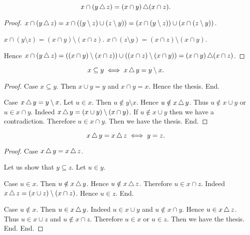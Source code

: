 \documentclass[../../set-theory.ftl.tex]{subfiles}
\begin{document}
\begin{forthel}
    \begin{proposition}\label{SetTheory_01_04_751668}
      \[ x \cap (y \mathop{\triangle} z) = (x \cap y) \mathop{\triangle} (x \cap z). \]
    \end{proposition}
    \begin{proof}
      $x \cap (y \mathop{\triangle} z) = x \cap ((y \setminus z) \cup (z \setminus y)) =
      (x \cap (y \setminus z)) \cup (x \cap (z \setminus y))$.

      $x \cap (y \setminus z) = (x \cap y) \setminus (x \cap z)$.
      $x \cap (z \setminus y) = (x \cap z) \setminus (x \cap y)$.

      Hence $x \cap (y \mathop{\triangle} z) = ((x \cap y) \setminus (x \cap z)) \cup
      ((x \cap z) \setminus (x \cap y)) = (x \cap y) \mathop{\triangle} (x \cap z)$.
    \end{proof}


    \begin{proposition}\label{SetTheory_01_04_420961}
      \[ x \subseteq y \iff x \mathop{\triangle} y = y \setminus x. \]
    \end{proposition}
    \begin{proof}
      Case $x \subseteq y$.
        Then $x \cup y = y$ and $x \cap y = x$.
        Hence the thesis.
      End.

      Case $x \mathop{\triangle} y = y \setminus x$.
        Let $u \in x$.
        Then $u \notin y \setminus x$.
        Hence $u \notin x \mathop{\triangle} y$.
        Thus $u \notin x \cup y$ or $u \in x \cap y$.
        Indeed $x \mathop{\triangle} y = (x \cup y) \setminus (x \cap y)$.
        If $u \notin x \cup y$ then we have a contradiction.
        Therefore $u \in x \cap y$.
        Then we have the thesis.
      End.
    \end{proof}


    \begin{proposition}\label{SetTheory_01_04_241267}
      \[ x \mathop{\triangle} y = x \mathop{\triangle} z \iff y = z. \]
    \end{proposition}
    \begin{proof}
      Case $x \mathop{\triangle} y = x \mathop{\triangle} z$.

        Let us show that $y \subseteq z$.
          Let $u \in y$.

          Case $u \in x$.
            Then $u \notin x \mathop{\triangle} y$.
            Hence $u \notin x \mathop{\triangle} z$.
            Therefore $u \in x \cap z$.
            Indeed $x \mathop{\triangle} z = (x \cup z) \setminus (x \cap z)$.
            Hence $u \in z$.
          End.

          Case $u \notin x$.
            Then $u \in x \mathop{\triangle} y$.
            Indeed $u \in x \cup y$ and $u \notin x \cap y$.
            Hence $u \in x \mathop{\triangle} z$.
            Thus $u \in x \cup z$ and $u \notin x \cap z$.
            Therefore $u \in x$ or $u \in z$.
            Then we have the thesis.
          End.
        End.


\end{proof}
\end{forthel}
\end{document}
